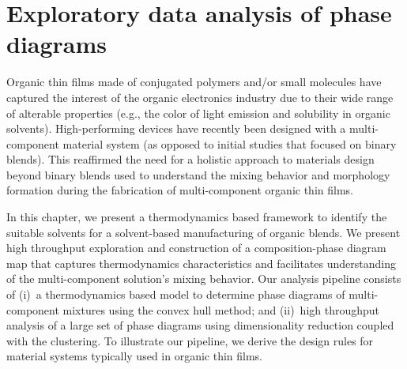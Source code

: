 \chapter{Exploratory data analysis of phase diagrams}\label{chapter4}
Organic thin films made of conjugated polymers and/or small molecules have captured the interest of the organic electronics industry due to their wide range of alterable properties (e.g., the color of light emission and solubility in organic solvents). 
High-performing devices have recently been designed with a multi-component material system (as opposed to initial studies that focused on binary blends). 
This reaffirmed the need for a holistic approach to materials design beyond binary blends used to understand the mixing behavior and morphology formation during the fabrication of multi-component organic thin films.

In this chapter, we present a thermodynamics based framework to identify the suitable solvents for a solvent-based manufacturing of organic blends. We present high throughput exploration and construction of a composition-phase diagram map that captures thermodynamics characteristics and facilitates understanding of the multi-component solution's mixing behavior. Our analysis pipeline consists of (i)~a thermodynamics based model to determine phase diagrams of multi-component mixtures using the convex hull method; and (ii)~high throughput analysis of a large set of phase diagrams using dimensionality reduction coupled with the clustering. To illustrate our pipeline, we derive the design rules for material systems typically
used in organic thin films.




